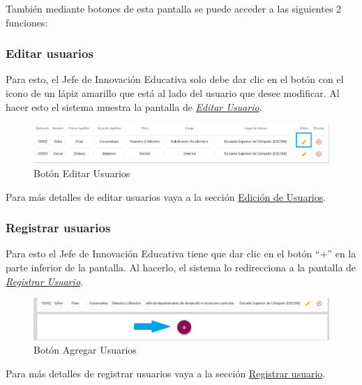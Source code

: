 También mediante botones de esta pantalla se puede acceder a las siguientes 2 funciones:

\subsubsection{Editar usuarios}

Para esto, el Jefe de Innovación Educativa solo debe dar clic en el botón con el icono de un lápiz amarillo que está al lado del usuario que desee modificar. Al hacer esto el sistema muestra la pantalla  de \hyperlink{editarUs-JIE}{\textit{Editar Usuario}}.

\begin{figure}[H]
	\centering
	\hypertarget{editar-JIE}{\includegraphics[width=0.7\linewidth]{images/SP5/BtnEditar}}
	\caption{Botón Editar Usuarios}
	\label{editar-JIE}
\end{figure}

Para más detalles de editar usuarios vaya a la sección \hyperlink{editar-user-JIE}{Edición de Usuarios}.

\subsubsection{Registrar  usuarios}

Para esto el Jefe de Innovación Educativa tiene que dar clic en el botón “+” en la parte inferior de la pantalla. Al hacerlo, el sistema  lo redirecciona a la pantalla de \hyperlink{registrarUs-JIE}{\textit{Registrar Usuario}}.

\begin{figure}[H]
	\centering
	\hypertarget{add-JIE}{\includegraphics[width=0.7\linewidth]{images/SP5/BtnAgregar}}
	\caption{Botón Agregar Usuarios}
	\label{add-JIE}
\end{figure}

Para más detalles de registrar usuarios vaya a la sección \hyperlink{registrar-Us-JIE}{Registrar usuario}.

